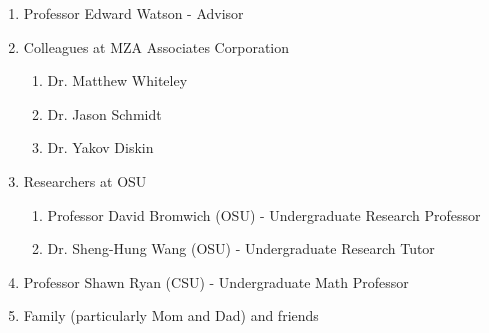 \begin{enumerate}
	\item Professor Edward Watson - Advisor
	\item Colleagues at MZA Associates Corporation
	\begin{enumerate}
		\item Dr. Matthew Whiteley
		\item Dr. Jason Schmidt
		\item Dr. Yakov Diskin
	\end{enumerate}
	\item Researchers at OSU
	\begin{enumerate}
		\item Professor David Bromwich (OSU) - Undergraduate Research Professor
		\item Dr. Sheng-Hung Wang (OSU) - Undergraduate Research Tutor
	\end{enumerate}
	\item Professor Shawn Ryan (CSU) - Undergraduate Math Professor
	\item Family (particularly Mom and Dad) and friends
\end{enumerate}


